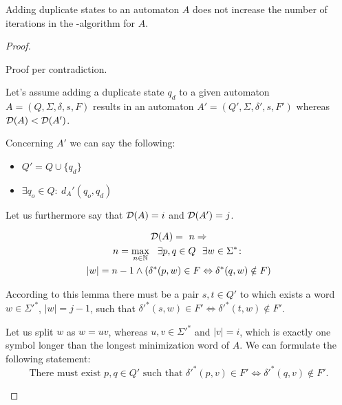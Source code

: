 \begin{theorem}[]
	Adding duplicate states to an automaton $A$ does not increase the number of iterations in the \MinMark-algorithm for $A$.
\end{theorem}

\begin{proof}
	\begin{description}
		\item
		
		Proof per contradiction.
		
		Let's assume adding a duplicate state $q_d$ to a given automaton $A = (Q, \Sigma, \delta, s, F)$ results in an automaton $A' = (Q', \Sigma, \delta', s, F')$ whereas $\mathcal{D}(A) < \mathcal{D}(A')$.
		
		Concerning $A'$ we can say the following:
		\begin{itemize}
			\item $Q' = Q \cup \{ q_d \}$
			\item $\exists q_o \in Q \colon\ d_A'(q_o, q_d)$
		\end{itemize}
		Let us furthermore say that $\mathcal{D}(A) = i$ and $\mathcal{D}(A') = j$.
		
		\begin{lemma}
			\begin{multline*}
			\mathcal{D}(A) =\ n \Rightarrow \\
			n = \max_{n \in \mathbb{N}}\ \ \exists p, q \in Q\ \ \exists w \in \Sigma^* \colon \\
			|w| = n - 1 \land (\delta^*(p,w) \in F \Leftrightarrow \delta^*(q,w) \notin F)
			\end{multline*}
		\end{lemma}
		According to this lemma there must be a pair $s, t \in Q'$ to which exists a word $w \in \Sigma'^*$, $|w| = j - 1$, such that $\delta'^*(s,w) \in F' \Leftrightarrow \delta'^*(t,w) \notin F'$.
		
		Let us split $w$ as $w = uv$, whereas $u,v \in\Sigma'^*$ and $|v| = i$, which is exactly one symbol longer than the longest minimization word of $A$. We can formulate the following statement:
		\begin{equation}
		\text{There must exist }p, q \in Q'\text{ such that }\delta'^*(p,v) \in F' \Leftrightarrow \delta'^*(q,v) \notin F'.
		\end{equation}
		

\end{description}
\end{proof}
